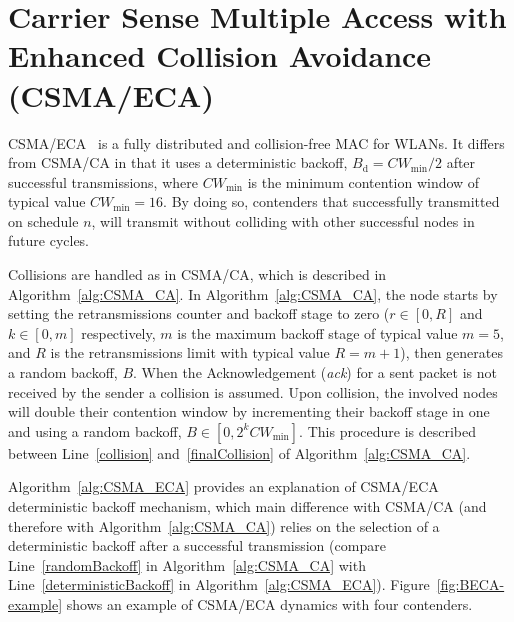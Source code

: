 \section{Carrier Sense Multiple Access with Enhanced Collision Avoidance (CSMA/ECA)}\label{introProtocol}

CSMA/ECA~\cite{barcelo2008lba} is a fully distributed and collision-free MAC for WLANs. It differs from CSMA/CA in that it uses a deterministic backoff, $B_{\text{d}}=CW_{\min}/2$ after successful transmissions, where $CW_{\min}$ is the minimum contention window of typical value $CW_{\min}=16$. By doing so, contenders that successfully transmitted on schedule $n$, will transmit without colliding with other successful nodes in future cycles.

Collisions are handled as in CSMA/CA, which is described in Algorithm~\ref{alg:CSMA_CA}. In Algorithm~\ref{alg:CSMA_CA}, the node starts by setting the retransmissions counter and backoff stage to zero ($r\in[0,R]$ and $k\in[0,m]$ respectively, $m$ is the maximum backoff stage of typical value $m=5$, and $R$ is the retransmissions limit with typical value $R=m+1$), then generates a random backoff, $B$. When the Acknowledgement (\emph{ack}) for a sent packet is not received by the sender a collision is assumed. Upon collision, the involved nodes will double their contention window by incrementing their backoff stage in one and using a random backoff, $B\in[0,2^{k}CW_{\min}]$. This procedure is described between Line~\ref{collision} and~\ref{finalCollision} of Algorithm~\ref{alg:CSMA_CA}.

Algorithm~\ref{alg:CSMA_ECA} provides an explanation of CSMA/ECA deterministic backoff mechanism, which main difference with CSMA/CA (and therefore with Algorithm~\ref{alg:CSMA_CA}) relies on the selection of a deterministic backoff after a successful transmission (compare Line~\ref{randomBackoff} in Algorithm~\ref{alg:CSMA_CA} with Line~\ref{deterministicBackoff} in Algorithm~\ref{alg:CSMA_ECA}). Figure~\ref{fig:BECA-example} shows an example of CSMA/ECA dynamics with four contenders.

